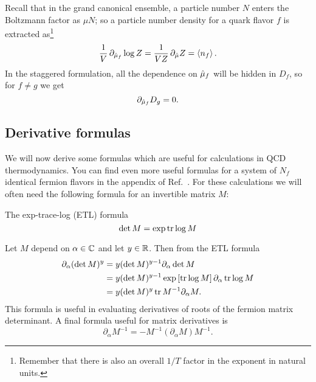 Recall that in the grand canonical ensemble, a particle number
$N$ enters the Boltzmann factor as $\mu N$; so a particle number density 
for a quark flavor $f$ is extracted as\footnote{Remember that there is also
an overall $1/T$ factor in the exponent in natural units.}
\begin{equation}\label{eq:nfdensity}
  \frac{1}{V}\,\partial_{\muh_f}\log Z
  =\frac{1}{VZ}\,\partial_{\muh} Z
  =\ev{n_f}.
\end{equation}
In the staggered formulation, all the dependence on $\hat{\mu}_f$ will be
hidden in $D_f$, so for $f\neq g$ we get
\begin{equation}
  \partial_{\hat{\mu}_f}D_g = 0.
\end{equation}

\subsection{Derivative formulas}

We will now derive some formulas which are useful for calculations in QCD
thermodynamics. You can find even more useful formulas for a system of 
$N_f$ identical
fermion flavors in the appendix of Ref.~\cite{allton_thermodynamics_2005}.
For these calculations we will often need the following formula for an
invertible matrix $M$:
\begin{theorem}{The exp-trace-log (ETL) formula}{}\label{thm:exptrlog} 
  $$\det M = \exp \tr \log M$$
\end{theorem}
Let $M$ depend on $\alpha\in\mathbb{C}$ and let $y\in\mathbb{R}$. Then from the ETL formula
\begin{equation}\begin{aligned}
  \partial_\alpha(\det M)^y &= y(\det M)^{y-1}\partial_\alpha\det M\\
      &= y(\det M)^{y-1}\exp\left[\tr\log M\right]\partial_\alpha\tr\log M\\
      &= y(\det M)^y \tr M^{-1}\partial_\alpha M.
\end{aligned}\end{equation}
This formula is useful in evaluating derivatives of roots of the fermion
matrix determinant. A final formula useful for matrix derivatives is
\begin{equation}
  \partial_\alpha M^{-1} = - M^{-1}\left(\partial_\alpha M\right) M^{-1}.
\end{equation}

